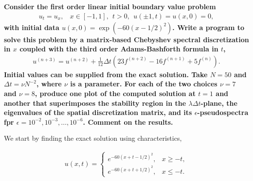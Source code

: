 \textbf{Consider the first order linear initial boundary value problem
\begin{align*}
u_t=u_x, ~~~~x\in[-1,1],~~t>0,~~u(\pm 1,t)=u(x,0)=0,
\end{align*}
with initial data $u(x,0) = \exp(-60(x-1/2)^2)$. Write a program to solve this problem by a matrix-based Chebyshev spectral discretization in $x$ coupled with the third order Adams-Bashforth formula in $t$, 
\begin{align*}
u^{(n+3)} = u^{(n+2)}+\frac{1}{12}\Delta t\left(23f^{(n+2)}-16f^{(n+1)}+5f^{(n)}\right).
\end{align*}
Initial values can be supplied from the exact solution. Take $N=50$ and \newline $\Delta t=\nu N^{-2}$, where $\nu$ is a parameter. For each of the two choices $\nu = 7$ and $\nu = 8$, produce one plot of the computed solution at $t=1$ and another that superimposes the stability region in the $\lambda\Delta t$-plane, the eigenvalues of the spatial discretization matrix, and its $\epsilon$-pseudospectra fpr $\epsilon=10^{-2},10^{-3},\dots,10^{-6}$. Comment on the results.
}
\newline

We start by finding the exact solution using characteristics,

\begin{align*}
u(x,t) = 
\begin{cases}
       e^{-60(x+t-1/2)^2},& x\geq -t,\\
       e^{-60(x+t+1/2)^2},& x\leq -t.
\end{cases}
\end{align*}

